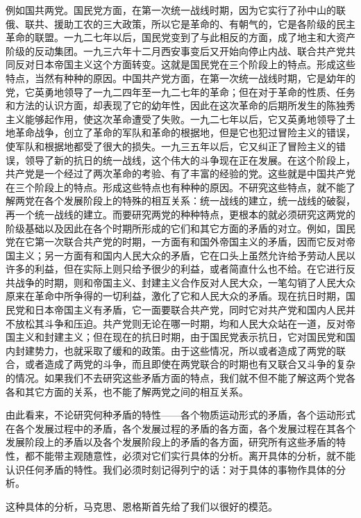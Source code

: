 例如国共两党。国民党方面，在第一次统一战线时期，因为它实行了孙中山的联俄、联共、援助工农的三大政策，所以它是革命的、有朝气的，它是各阶级的民主革命的联盟。一九二七年以后，国民党变到了与此相反的方面，成了地主和大资产阶级的反动集团。一九三六年十二月西安事变后又开始向停止内战、联合共产党共同反对日本帝国主义这个方面转变。这就是国民党在三个阶段上的特点。形成这些特点，当然有种种的原因。中国共产党方面，在第一次统一战线时期，它是幼年的党，它英勇地领导了一九二四年至一九二七年的革命；但在对于革命的性质、任务和方法的认识方面，却表现了它的幼年性，因此在这次革命的后期所发生的陈独秀主义能够起作用，使这次革命遭受了失败。一九二七年以后，它又英勇地领导了土地革命战争，创立了革命的军队和革命的根据地，但是它也犯过冒险主义的错误，使军队和根据地都受了很大的损失。一九三五年以后，它又纠正了冒险主义的错误，领导了新的抗日的统一战线，这个伟大的斗争现在正在发展。在这个阶段上，共产党是一个经过了两次革命的考验、有了丰富的经验的党。这些就是中国共产党在三个阶段上的特点。形成这些特点也有种种的原因。不研究这些特点，就不能了解两党在各个发展阶段上的特殊的相互关系：统一战线的建立，统一战线的破裂，再一个统一战线的建立。而要研究两党的种种特点，更根本的就必须研究这两党的阶级基础以及因此在各个时期所形成的它们和其它方面的矛盾的对立。例如，国民党在它第一次联合共产党的时期，一方面有和国外帝国主义的矛盾，因而它反对帝国主义；另一方面有和国内人民大众的矛盾，它在口头上虽然允许给予劳动人民以许多的利益，但在实际上则只给予很少的利益，或者简直什么也不给。在它进行反共战争的时期，则和帝国主义、封建主义合作反对人民大众，一笔勾销了人民大众原来在革命中所争得的一切利益，激化了它和人民大众的矛盾。现在抗日时期，国民党和日本帝国主义有矛盾，它一面要联合共产党，同时它对共产党和国内人民并不放松其斗争和压迫。共产党则无论在哪一时期，均和人民大众站在一道，反对帝国主义和封建主义；但在现在的抗日时期，由于国民党表示抗日，它对国民党和国内封建势力，也就采取了缓和的政策。由于这些情况，所以或者造成了两党的联合，或者造成了两党的斗争，而且即使在两党联合的时期也有又联合又斗争的复杂的情况。如果我们不去研究这些矛盾方面的特点，我们就不但不能了解这两个党各各和其它方面的关系，也不能了解两党之间的相互关系。

由此看来，不论研究何种矛盾的特性——各个物质运动形式的矛盾，各个运动形式在各个发展过程中的矛盾，各个发展过程的矛盾的各方面，各个发展过程在其各个发展阶段上的矛盾以及各个发展阶段上的矛盾的各方面，研究所有这些矛盾的特性，都不能带主观随意性，必须对它们实行具体的分析。离开具体的分析，就不能认识任何矛盾的特性。我们必须时刻记得列宁的话：对于具体的事物作具体的分析。

这种具体的分析，马克思、恩格斯首先给了我们以很好的模范。

